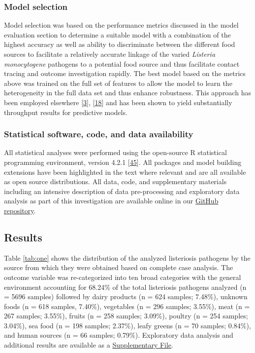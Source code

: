 \documentclass[
  10pt,
]{article}
\begin{document}
\hypertarget{model-selection}{%
\subsubsection{Model selection}\label{model-selection}}

Model selection was based on the performance metrics discussed in the model evaluation section to determine a suitable model with a combination of the highest accuracy as well as ability to discriminate between the different food sources to facilitate a relatively accurate linkage of the varied \emph{Listeria monocytogene} pathogens to a potential food source and thus facilitate contact tracing and outcome investigation rapidly. The best model based on the metrics above was trained on the full set of features to allow the model to learn the heterogeneity in the full data set and thus enhance robustness. This approach has been employed elsewhere {[}\protect\hyperlink{ref-tanui2022machine}{3}{]}, {[}\protect\hyperlink{ref-Munck2020}{18}{]} and has been shown to yield substantially throughput results for predictive models.

\hypertarget{statistical-software-code-and-data-availability}{%
\subsubsection{Statistical software, code, and data availability}\label{statistical-software-code-and-data-availability}}

All statistical analyses were performed using the open-source R statistical programming environment, version 4.2.1 {[}\protect\hyperlink{ref-R}{45}{]}. All packages and model building extensions have been highlighted in the text where relevant and are all available as open source distributions. All data, code, and supplementary materials including an intensive description of data pre-processing and exploratory data analysis as part of this investigation are available online in our \href{https://github.com/okutse/foodborne_diseases}{GitHub repository}.

\hypertarget{results}{%
\subsection{Results}\label{results}}

Table \ref{tab:one} shows the distribution of the analyzed listeriosis pathogens by the source from which they were obtained based on complete case analysis. The outcome variable was re-categorized into ten broad categories with the general environment accounting for 68.24\% of the total listeriosis pathogens analyzed (n = 5696 samples) followed by dairy products (n = 624 samples; 7.48\%), unknown foods (n = 618 samples, 7.40\%), vegetables (n = 296 samples; 3.55\%), meat (n = 267 samples; 3.55\%), fruits (n = 258 samples; 3.09\%), poultry (n = 254 samples; 3.04\%), sea food (n = 198 samples; 2.37\%), leafy greens (n = 70 samples; 0.84\%), and human sources (n = 66 samples; 0.79\%). Exploratory data analysis and additional results are available as a \href{https://github.com/okutse/foodborne_diseases/blob/main/supplementary_materials.pdf}{Supplementary File}.
\end{document}
